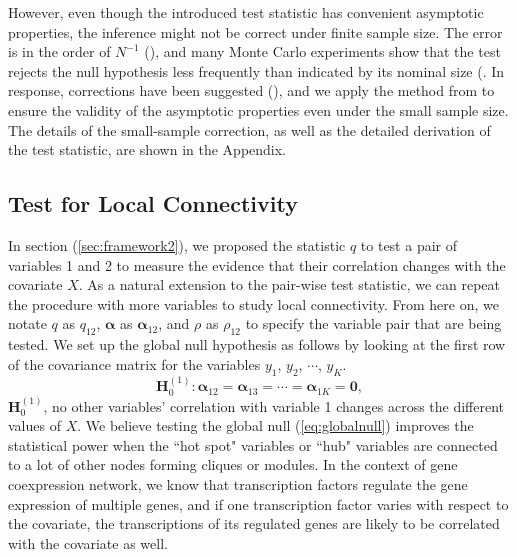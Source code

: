 \documentclass[aoas,authoryear, preprint]{imsart}
\numberwithin{equation}{section}
\theoremstyle{plain}
\begin{document}
However, even though the introduced test statistic has convenient asymptotic properties, the inference might not be correct under finite sample size. The error is in the order of $N^{-1}$ (\cite{harris1985asymptotic}), and many Monte Carlo experiments show that the test rejects the null hypothesis less frequently than indicated by its nominal size (\cite{ godfrey1978testing, griffiths1986monte}. In response, corrections have been suggested (\cite{cribari2001monotonic, harris1985asymptotic}), and we apply the method from \cite{honda1988size} to ensure the validity of the asymptotic properties even under the small sample size. The details of the small-sample correction, as well as the detailed derivation of the test statistic, are shown in the Appendix.


\subsection{Test for Local Connectivity \label{sec:frameworkK}} 
In section (\ref{sec:framework2}), we proposed the statistic $q$ to test a pair of variables 1 and 2 to measure the evidence that their correlation changes with the covariate $X$. As a natural extension to the pair-wise test statistic, we can repeat the procedure with more variables to study local connectivity. From here on, we notate $q$ as $q_{12}$, $\bm{\alpha}$ as $\bm{\alpha}_{12}$, and $\rho$ as $\rho_{12}$ to specify the variable pair that are being tested. We set up the global null hypothesis as follows by looking at the first row of the covariance matrix for the variables $y_1$, $y_2$, $\cdots$, $y_K$. 
\begin{equation}
    \bm{H}_0^{(1)}: \bm{\alpha}_{12} = \bm{\alpha}_{13} = \cdots = \bm{\alpha}_{1K} = \bm{0},
\label{eq:globalnull}
\end{equation}
$\bm{H}_0^{(1)}$, no other variables' correlation with variable 1 changes across the different values of  $X$. We believe testing the global null (\ref{eq:globalnull}) improves the statistical power when the ``hot spot" variables or ``hub" variables are connected to a lot of other nodes forming cliques or modules. In the context of gene coexpression network, we know that transcription factors regulate the gene expression of multiple genes, and if one transcription factor varies with respect to the covariate, the transcriptions of its regulated genes are likely to be correlated with the covariate as well. \\
\end{document}
